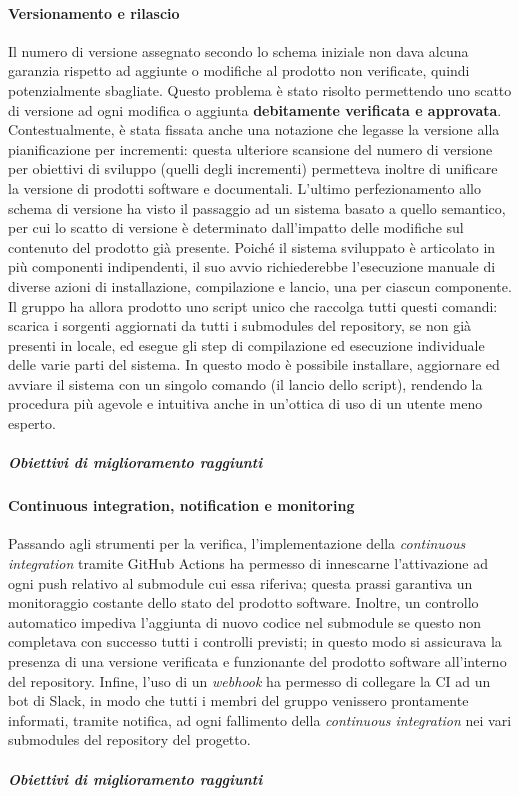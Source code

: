 			\paragraph{Versionamento e rilascio}
				Il numero di versione assegnato secondo lo schema iniziale non dava alcuna garanzia rispetto ad aggiunte o modifiche al prodotto non verificate, quindi potenzialmente sbagliate. Questo problema è stato risolto permettendo uno scatto di versione ad ogni modifica o aggiunta \textbf{debitamente verificata e approvata}. Contestualmente, è stata fissata anche una notazione che legasse la versione alla pianificazione per incrementi: questa ulteriore scansione del numero di versione per obiettivi di sviluppo (quelli degli incrementi) permetteva inoltre di unificare la versione di prodotti software e documentali. L'ultimo perfezionamento allo schema di versione ha visto il passaggio ad un sistema basato a quello semantico, per cui lo scatto di versione è determinato dall'impatto delle modifiche sul contenuto del prodotto già presente.
				\newline
				Poiché il sistema sviluppato è articolato in più componenti indipendenti, il suo avvio richiederebbe l'esecuzione manuale di diverse azioni di installazione, compilazione e lancio, una per ciascun componente. Il gruppo ha allora prodotto uno script unico che raccolga tutti questi comandi: scarica i sorgenti aggiornati da tutti i submodules del repository, se non già presenti in locale, ed esegue gli step di compilazione ed esecuzione individuale delle varie parti del sistema. In questo modo è possibile installare, aggiornare ed avviare il sistema con un singolo comando (il lancio dello script), rendendo la procedura più agevole e intuitiva anche in un'ottica di uso di un utente meno esperto.
				
				\subparagraph{Obiettivi di miglioramento raggiunti}
			
			\paragraph{Continuous integration, notification e monitoring}
				Passando agli strumenti per la verifica, l'implementazione della \textit{continuous integration} tramite GitHub Actions ha permesso di innescarne l'attivazione ad ogni push relativo al submodule cui essa riferiva; questa prassi garantiva un monitoraggio costante dello stato del prodotto software. Inoltre, un controllo automatico impediva l'aggiunta di nuovo codice nel submodule se questo non completava con successo tutti i controlli previsti; in questo modo si assicurava la presenza di una versione verificata e funzionante del prodotto software all'interno del repository. Infine, l'uso di un \textit{webhook} ha permesso di collegare la CI ad un bot di Slack, in modo che tutti i membri del gruppo venissero prontamente informati, tramite notifica, ad ogni fallimento della \textit{continuous integration} nei vari submodules del repository del progetto.
				
				\subparagraph{Obiettivi di miglioramento raggiunti}

